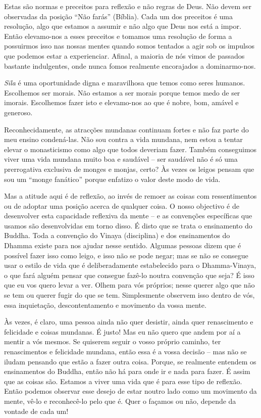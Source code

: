 Estas são normas e preceitos para reflexão e não regras de Deus. Não devem ser
observadas da posição ``Não farás'' (Bíblia). Cada um dos preceitos é uma
resolução, algo que estamos a assumir e não algo que Deus nos está a impor.
Então elevamo-nos a esses preceitos e tomamos uma resolução de forma a
possuirmos isso nas nossas mentes quando somos tentados a agir sob os impulsos
que podemos estar a experienciar. Afinal, a maioria de nós vimos de passados
bastante indulgentes, onde nunca fomos realmente encorajados a dominarmo-nos.

\emph{Sīla} é uma oportunidade digna e maravilhosa que temos como seres humanos.
Escolhemos ser morais. Não estamos a ser morais porque temos medo de ser
imorais. Escolhemos fazer isto e elevamo-nos ao que é nobre, bom, amável e
generoso.

Reconhecidamente, as atracções mundanas continuam fortes e não faz parte do meu
ensino condená-las. Não sou contra a vida mundana, nem estou a tentar elevar o
monasticismo como algo que todos deveriam fazer. Também conseguimos viver uma
vida mundana muito boa e saudável -- ser saudável não é só uma prerrogativa
exclusiva de monges e monjas, certo? Às vezes os leigos pensam que sou um
``monge fanático'' porque enfatizo o valor deste modo de vida.

Mas a atitude aqui é de reflexão, ao invés de remoer as coisas com
ressentimentos ou de adoptar uma posição acerca de qualquer coisa. O nosso
objectivo é de desenvolver esta capacidade reflexiva da mente -- e as convenções
específicas que usamos são desenvolvidas em torno disso. É disto que se trata o
ensinamento do Buddha. Toda a convenção do Vinaya (disciplina) e dos
ensinamentos do Dhamma existe para nos ajudar nesse sentido. Algumas
pessoas dizem que é possível fazer isso como leigo, e isso não se pode negar;
mas se não se consegue usar o estilo de vida que é deliberadamente estabelecido
para o Dhamma-Vinaya, o que fará alguém pensar que consegue fazê-lo
noutra convenção que seja? É isso que eu vos quero levar a ver. Olhem para vós
próprios; nesse querer algo que não se tem ou querer fugir do que se tem.
Simplesmente observem isso dentro de vós, essa inquietação, descontentamento e
movimento da vossa mente.

Às vezes, é claro, uma pessoa ainda não quer desistir, ainda quer renascimento e
felicidade e coisas mundanas. É justo! Mas eu não quero que andem por aí a
mentir a vós mesmos. Se quiserem seguir o vosso próprio caminho, ter
renascimentos e felicidade mundana, então essa é a vossa decisão -- mas não se
iludam pensando que estão a fazer outra coisa. Porque, se realmente entendem os
ensinamentos do Buddha, então não há para onde ir e nada para fazer. É assim que
as coisas são. Estamos a viver uma vida que é para esse tipo de reflexão. Então
podemos observar esse desejo de estar noutro lado como um movimento da mente,
vê-lo e reconhecê-lo pelo que é. Quer o façamos ou não, depende da vontade de
cada um!

